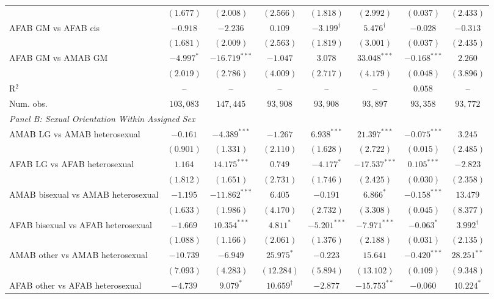 \begin{table}[htpb!]
{\begin{tabular}{l c c c c c c c}
 & $(1.677)$ & $(2.008)$ & $(2.566)$ & $(1.818)$ & $(2.992)$ & $(0.037)$ & $(2.433)$ \\
AFAB GM vs AFAB cis & $-0.918$ & $-2.236$ & $0.109$ & $-3.199^{\dagger}$ & $5.476^{\dagger}$ & $-0.028$ & $-0.313$ \\
 & $(1.681)$ & $(2.009)$ & $(2.563)$ & $(1.819)$ & $(3.001)$ & $(0.037)$ & $(2.435)$ \\
AFAB GM vs AMAB GM & $-4.997^{*}$ & $-16.719^{***}$ & $-1.047$ & $3.078$ & $33.048^{***}$ & $-0.168^{***}$ & $2.260$ \\
 & $(2.019)$ & $(2.786)$ & $(4.009)$ & $(2.717)$ & $(4.179)$ & $(0.048)$ & $(3.896)$ \\
\hline
R$^2$ & -- & -- & -- & -- & -- & $0.058$ & -- \\
Num. obs. & $103,083$ & $147,445$ & $93,908$ & $93,908$ & $93,897$ & $93,358$ & $93,772$ \\
\hline
\multicolumn{8}{l}{\textit{Panel B: Sexual Orientation Within Assigned Sex}} \\
AMAB LG vs AMAB heterosexual & $-0.161$ & $-4.389^{***}$ & $-1.267$ & $6.938^{***}$ & $21.397^{***}$ & $-0.075^{***}$ & $3.245$ \\
 & $(0.901)$ & $(1.331)$ & $(2.110)$ & $(1.628)$ & $(2.722)$ & $(0.015)$ & $(2.485)$ \\
AFAB LG vs AFAB heterosexual & $1.164$ & $14.175^{***}$ & $0.749$ & $-4.177^{*}$ & $-17.537^{***}$ & $0.105^{***}$ & $-2.823$ \\
 & $(1.812)$ & $(1.651)$ & $(2.731)$ & $(1.746)$ & $(2.425)$ & $(0.030)$ & $(2.358)$ \\
AMAB bisexual vs AMAB heterosexual & $-1.195$ & $-11.862^{***}$ & $6.405$ & $-0.191$ & $6.866^{*}$ & $-0.158^{***}$ & $13.479$ \\
 & $(1.633)$ & $(1.986)$ & $(4.170)$ & $(2.732)$ & $(3.308)$ & $(0.045)$ & $(8.377)$ \\
AFAB bisexual vs AFAB heterosexual & $-1.669$ & $10.354^{***}$ & $4.811^{*}$ & $-5.201^{***}$ & $-7.971^{***}$ & $-0.063^{*}$ & $3.992^{\dagger}$ \\
 & $(1.088)$ & $(1.166)$ & $(2.061)$ & $(1.376)$ & $(2.188)$ & $(0.031)$ & $(2.135)$ \\
AMAB other vs AMAB heterosexual & $-10.739$ & $-6.949$ & $25.975^{*}$ & $-0.223$ & $15.641$ & $-0.420^{***}$ & $28.251^{**}$ \\
 & $(7.093)$ & $(4.283)$ & $(12.284)$ & $(5.894)$ & $(13.102)$ & $(0.109)$ & $(9.348)$ \\
AFAB other vs AFAB heterosexual & $-4.739$ & $9.079^{*}$ & $10.659^{\dagger}$ & $-2.877$ & $-15.753^{**}$ & $-0.060$ & $10.224^{*}$ \\

\end{tabular}}
\end{table}
